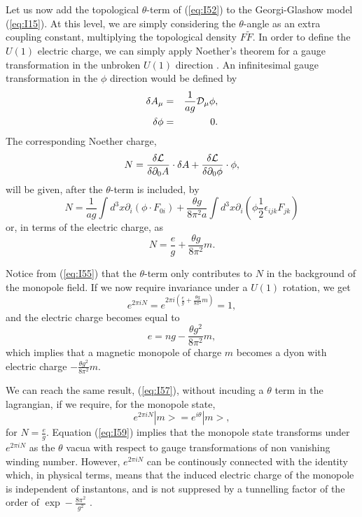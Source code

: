 Let us now add the topological $\theta$-term of (\ref{eq:I52}) to
the Georgi-Glashow model (\ref{eq:I15}). At this level, we are
simply considering the $\theta$-angle as an extra coupling
constant, multiplying the topological density $F \tilde{F}$. In
order to define the $U(1)$ electric charge, we can simply apply
Noether's theorem for a gauge transformation in the unbroken
$U(1)$ direction \cite{Wdyon}. An infinitesimal gauge transformation in the
$\phi$ direction would be defined by
\begin{eqnarray}
\delta A_{\mu} & = & \frac {1}{ag} {\cal D}_{\mu} \phi, \nonumber \\
\delta \phi    & = & 0.
\label{eq:I53}
\end{eqnarray}
The corresponding Noether charge,
\begin{equation}
N = \frac {\delta {\cal L}}{\delta \partial_0 A} \cdot \delta A +
\frac {\delta {\cal L}}{\delta \partial _0 \phi} \cdot \phi,
\label{eq:I54}
\end{equation}
will be given, after the $\theta$-term is included, by 
\begin{equation}
N = \frac {1}{ag} \int d^3x \partial_i (\phi \cdot F_{0i}) +
\frac {\theta g}{8 \pi^2 a} \int d^3x \partial_i ( \phi \frac
{1}{2} \epsilon_{ijk} F_{jk})
\label{eq:I55}
\end{equation}
or, in terms of the electric charge, as
\begin{equation}
N = \frac {e}{g} + \frac {\theta g}{8 \pi^2}m.
\label{eq:I56}
\end{equation}
  
Notice from (\ref{eq:I55}) that the $\theta$-term only
contributes to $N$ in the background of the monopole field. If we
now require invariance under a $U(1)$ rotation, we get
\begin{equation}
e^{2 \pi i N} = e^{2 \pi i \left( \frac {e}{g} + \frac {\theta
g}{8 \pi^2}m \right)} = 1,
\label{eq:I57}
\end{equation}
and the electric charge becomes equal to \cite{Wdyon}
\begin{equation}
e = ng - \frac {\theta g^2}{8 \pi^2}m,
\label{eq:I58}
\end{equation}
which implies that a magnetic monopole of charge $m$ becomes a
dyon with electric charge $- \frac {\theta g^2}{8 \pi^2}m$. 
  
We can reach the same result, (\ref{eq:I57}), without incuding a
$\theta$ term in the lagrangian, if we require, for the monopole
state,
\begin{equation}
e^{2 \pi i N} |m> = e^{i\theta} |m>,
\label{eq:I59}
\end{equation}
for $N=\frac {e}{g}$. Equation (\ref{eq:I59}) implies that the
monopole state transforms under $e^{2 \pi i N}$ as the $\theta$
vacua with respect to gauge transformations of non vanishing
winding number. However, $e^{2 \pi i N}$ can be continously
connected with the identity which, in physical terms, means that
the induced electric charge of the monopole is independent of instantons, and is
not suppresed by a tunnelling factor of the order of $\exp -
\frac {8 \pi^2}{g^2}$ \cite{Wdyon,Rubakov}.
  
